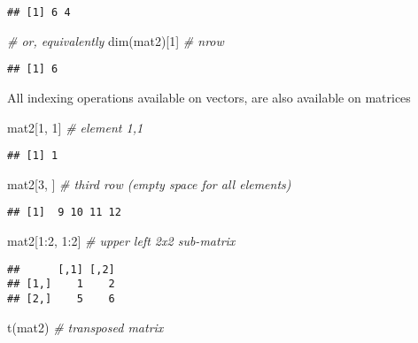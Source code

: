 \documentclass[
  oneside]{book}
\newenvironment{Shaded}{\begin{snugshade}}{\end{snugshade}}
\newcommand{\CommentTok}[1]{\textcolor[rgb]{0.56,0.35,0.01}{\textit{#1}}}
\newcommand{\DecValTok}[1]{\textcolor[rgb]{0.00,0.00,0.81}{#1}}
\newcommand{\FunctionTok}[1]{\textcolor[rgb]{0.00,0.00,0.00}{#1}}
\newcommand{\NormalTok}[1]{#1}
\newcommand{\SpecialCharTok}[1]{\textcolor[rgb]{0.00,0.00,0.00}{#1}}
\begin{document}
\begin{verbatim}
## [1] 6 4
\end{verbatim}

\begin{Shaded}
\begin{Highlighting}[]
\CommentTok{\# or, equivalently}
\FunctionTok{dim}\NormalTok{(mat2)[}\DecValTok{1}\NormalTok{] }\CommentTok{\# nrow}
\end{Highlighting}
\end{Shaded}

\begin{verbatim}
## [1] 6
\end{verbatim}

All indexing operations available on vectors, are also available on
matrices

\begin{Shaded}
\begin{Highlighting}[]
\NormalTok{mat2[}\DecValTok{1}\NormalTok{, }\DecValTok{1}\NormalTok{] }\CommentTok{\# element 1,1}
\end{Highlighting}
\end{Shaded}

\begin{verbatim}
## [1] 1
\end{verbatim}

\begin{Shaded}
\begin{Highlighting}[]
\NormalTok{mat2[}\DecValTok{3}\NormalTok{, ] }\CommentTok{\# third row (empty space for all elements)}
\end{Highlighting}
\end{Shaded}

\begin{verbatim}
## [1]  9 10 11 12
\end{verbatim}

\begin{Shaded}
\begin{Highlighting}[]
\NormalTok{mat2[}\DecValTok{1}\SpecialCharTok{:}\DecValTok{2}\NormalTok{, }\DecValTok{1}\SpecialCharTok{:}\DecValTok{2}\NormalTok{] }\CommentTok{\# upper left 2x2 sub{-}matrix}
\end{Highlighting}
\end{Shaded}

\begin{verbatim}
##      [,1] [,2]
## [1,]    1    2
## [2,]    5    6
\end{verbatim}

\begin{Shaded}
\begin{Highlighting}[]
\FunctionTok{t}\NormalTok{(mat2) }\CommentTok{\# transposed matrix}
\end{Highlighting}
\end{Shaded}
\end{document}
